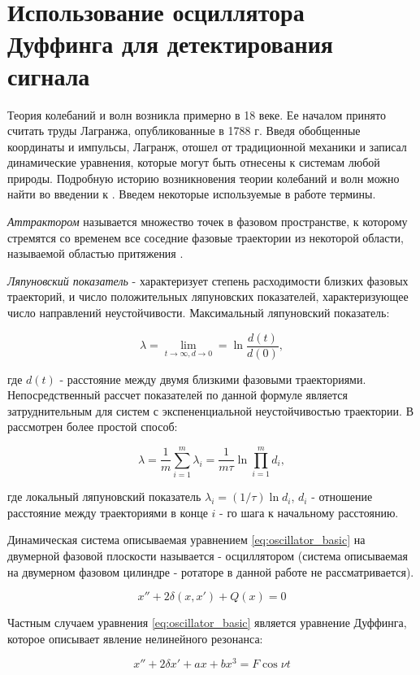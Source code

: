 \section{Использование осциллятора Дуффинга для детектирования сигнала}
Теория колебаний и волн возникла примерно в 18 веке. Ее началом принято считать труды Лагранжа, опубликованные в 1788 г. Введя обобщенные
координаты и импульсы, Лагранж, отошел от традиционной механики и записал динамические уравнения, которые могут быть отнесены к системам
любой природы. Подробную историю возникновения теории колебаний и волн можно найти во введении к \cite{landa_book}. 
Введем некоторые используемые в работе термины.

\emph{Аттрактором} называется множество точек в фазовом пространстве, к которому стремятся со
временем все соседние фазовые траектории из некоторой области, называемой областью притяжения \cite{landa_book}.

\emph{Ляпуновский показатель} - 
характеризует степень расходимости близких фазовых траекторий, и число положительных ляпуновских показателей, характеризующее число направлений
неустойчивости. Максимальный ляпуновский показатель:
\begin{center}
\begin{equation}
	\label{eq:exp_lyapunova_1}
	\lambda = \lim \limits_{t \to \infty, d \to 0} = \ln \frac{d(t)}{d(0)},
\end{equation}
\end{center}
где ${d(t)}$ - расстояние между двумя близкими фазовыми траекториями. Непосредственный рассчет показателей по данной формуле является
затруднительным для систем с экспененциальной неустойчивостью траектории. В \cite{landa_book} рассмотрен более простой способ:
\begin{center}
\begin{equation}
	\label{eq:exp_lyapunova_2}
	\lambda = \frac{1}{m}\sum \limits_{i=1}^m \lambda_i = \frac{1}{m\tau}\ln\prod \limits_{i=1}^md_i,
\end{equation}
\end{center}
где локальный ляпуновский показатель ${\lambda_i}=(1/ \tau)\ln d_i$, ${d_i}$ - отношение расстояние между траекториями в конце ${i}$ - го
шага к начальному расстоянию.

Динамическая система описываемая уравнением \ref{eq:oscillator_basic} на двумерной фазовой плоскости называется - осциллятором (система
описываемая на двумерном фазовом цилиндре - ротаторе в данной работе не рассматривается)\cite{chaos_neimark_landa}.
\begin{center}
\begin{equation}
	\label{eq:oscillator_basic}
	x'' + 2\delta(x, x') + Q(x) = 0
\end{equation}
\end{center}

Частным случаем уравнения \ref{eq:oscillator_basic} является уравнение Дуффинга, которое описывает явление нелинейного резонанса:
\begin{center}
\begin{equation}
	\label{eq:oscillator_duffing}
	x'' + 2\delta{x'} + ax +bx^3 = F\cos{\nu{t}}
\end{equation}
\end{center}

\newpage
